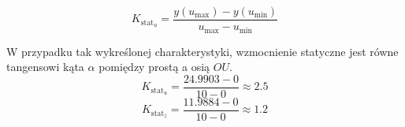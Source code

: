\begin{equation}
K_{\mathrm{stat}_u} = \frac{y(u_{\mathrm{max}})- y(u_{\mathrm{min}})}{u_{\mathrm{max}}- u_{\mathrm{min}}}
\label{zad2_wzm_statyczne_wzor}
\end{equation}

W przypadku tak wykreślonej charakterystyki, wzmocnienie statyczne jest równe tangensowi kąta $\alpha$
pomiędzy prostą a osią $OU$. 
\begin{equation}
K_{\mathrm{stat}_u} = \frac{24.9903- 0}{10- 0}\approx 2.5
\label{zad2_wzm_statyczne_u}
\end{equation}
\begin{equation}
K_{\mathrm{stat}_z} = \frac{11.9884- 0}{10- 0}\approx 1.2
\label{zad2_wzm_statyczne_z}
\end{equation}

